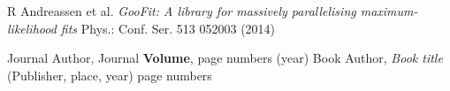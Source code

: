 \documentclass{webofc}
\begin{document}
%
% 
%
%
\begin{thebibliography}{}
%
%

R Andreassen et al.
\textit{GooFit: A library for massively parallelising maximum-likelihood fits}
Phys.: Conf. Ser. 513 052003 (2014)

Journal Author, Journal \textbf{Volume}, page numbers (year)
Book Author, \textit{Book title} (Publisher, place, year) page numbers
\end{thebibliography}
\end{document}
